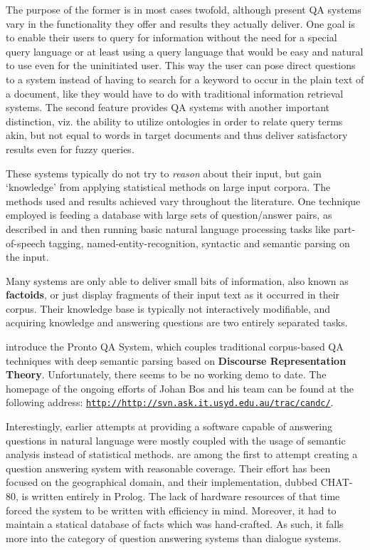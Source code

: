 \documentclass[a4paper]{article}
\newcommand{\abbr}{\textsf} %
\newcommand{\term}[1]{\textsf{\textbf{#1}}} %
\newcommand{\code}[1]{\texttt{#1}} %
\newcommand{\pn}{\textsf} %
\newcommand{\url}[1]{\code{http://#1}} %
\newcommand{\prol}{\pn{Prolog}}
\theoremstyle{remark}
\theoremstyle{remark}
\theoremstyle{definition}
\theoremstyle{definition}
\begin{document}
The purpose of the former is in most cases twofold, although present
\abbr{QA} systems vary in the functionality they offer
and results they actually deliver. One goal is to enable their users to
query for information without the need for a special query language or at least
using a query language that would be easy and natural to use even for the
uninitiated user. This way the user can pose direct questions to a system
instead of having to search for a keyword to occur in the plain text of a
document, like they would have to do with traditional information
retrieval systems. The second feature provides \abbr{QA} systems with another important
distinction, viz. the ability to utilize ontologies in order to relate query
terms akin, but not equal to words in target documents and thus deliver
satisfactory results even for fuzzy queries.

These systems typically do not try to \emph{reason} about
their input, but gain `knowledge' from applying statistical methods on large
input corpora. The methods used and results achieved vary throughout the
literature. One technique employed is feeding a database with large sets of
question/answer pairs, as described in \cite{rama} and then running basic
natural language processing tasks like part-of-speech tagging,
named-entity-recognition, syntactic and semantic parsing on the input.

Many systems are only able to deliver small bits of information, also known as
\term{factoids}, or just display fragments of their input text as it occurred in
their corpus. Their knowledge base is typically not interactively modifiable,
and acquiring knowledge and answering questions are two entirely separated
tasks.

\cite{prontoqa} introduce the \pn{Pronto QA System}, which couples traditional
corpus-based \abbr{QA} techniques with deep semantic parsing based on
\term{Discourse Representation Theory}. Unfortunately, there seems
to be no working demo to date. The homepage of the ongoing efforts of Johan Bos
and his team can be found at the following address:
\href{http://svn.ask.it.usyd.edu.au/trac/candc/}{\url{http://svn.ask.it.usyd.edu.au/trac/candc/}}.

Interestingly, earlier attempts at providing a software capable of answering
questions in natural language were mostly coupled with the usage of
semantic analysis instead of statistical methods.
\cite{chat} are among  the first to attempt creating a question answering system
with reasonable coverage. Their effort has been focused on the geographical
domain, and their implementation, dubbed \pn{CHAT-80}, is written entirely in
\prol. The lack of hardware resources of that time forced the system to be
written with efficiency in mind. Moreover, it had to maintain a statical
database of facts which was hand-crafted. As such, it falls more into the
category of question answering systems than dialogue systems.
\end{document}
